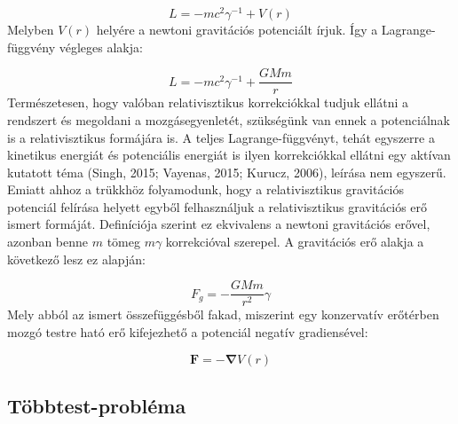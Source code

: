 \begin{multicols}{2}
\begin{equation}
    L
    =
    - mc^{2} \gamma^{-1} + V(r)
\end{equation}
Melyben $V \left( r \right)$ helyére a newtoni gravitációs potenciált írjuk. Így a Lagrange-függvény végleges alakja:

\begin{equation}
    L
    =
    - mc^{2} \gamma^{-1} + \frac{GMm}{r}
\end{equation}
Természetesen, hogy valóban relativisztikus korrekciókkal tudjuk ellátni a rendszert és megoldani a mozgásegyenletét, szükségünk van ennek a potenciálnak is a relativisztikus formájára is. A teljes Lagrange-függvényt, tehát egyszerre a kinetikus energiát és potenciális energiát is ilyen korrekciókkal ellátni egy aktívan kutatott téma (Singh, 2015\cite{2015CaJPh..93..549S}; Vayenas, 2015\cite{vayenas2015gravitational}; Kurucz, 2006\cite{kurucz2006precession}), leírása nem egyszerű. Emiatt ahhoz a trükkhöz folyamodunk, hogy a relativisztikus gravitációs potenciál felírása helyett egyből felhasználjuk a relativisztikus gravitációs erő ismert formáját. Definíciója szerint ez ekvivalens a newtoni gravitációs erővel, azonban benne $m$ tömeg $m \gamma$ korrekcióval szerepel. A gravitációs erő alakja a következő lesz ez alapján:

\begin{equation}
    F_{g} = - \frac{GMm}{r^{2}} \gamma
\end{equation}
Mely abból az ismert összefüggésből fakad, miszerint egy konzervatív erőtérben mozgó testre ható erő kifejezhető a potenciál negatív gradiensével:

\begin{equation}
    \boldsymbol{F} = - \boldsymbol{\nabla} V \left( r \right)
\end{equation}

\subsection{Többtest-probléma}

\end{multicols}